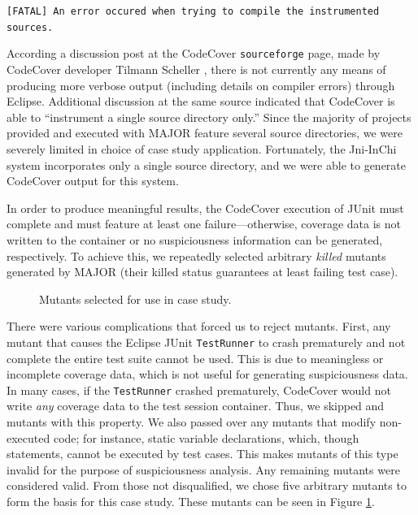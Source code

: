 \vspace{5mm}
\texttt{[FATAL] An error occured when trying to compile the instrumented sources.}
\vspace{2mm}

According a discussion post at the CodeCover \texttt{sourceforge}
page, made by CodeCover developer Tilmann Scheller \cite{discpost}, there is not currently any 
means of producing more verbose output (including details on compiler errors) through Eclipse.  
Additional discussion at the same source indicated that CodeCover is able to ``instrument
a single source directory only.''  Since the majority of projects provided and executed with MAJOR
feature several source directories, we were severely limited in choice of case study application.  
Fortunately, the Jni-InChi system incorporates only a single source directory, and we were able
to generate CodeCover output for this system.

In order to produce meaningful results, the CodeCover execution of JUnit must complete and must
feature at least one failure---otherwise, coverage data is not written to the container or no
suspiciousness information can be generated, respectively.  To achieve this, we repeatedly selected
arbitrary \textit{killed} mutants generated by MAJOR (their killed status guarantees at least failing
test case).  

\begin{figure}[tb]

\caption{Mutants selected for use in case study.}
\label{fig:mutants}
\end{figure}

There were various complications that forced us to reject mutants.  First, any mutant that
causes the Eclipse JUnit \texttt{TestRunner} to crash prematurely and not complete the entire test 
suite cannot be used.  This is due to meaningless or incomplete coverage data, which is not useful
for generating suspiciousness data.  In many cases, if the \texttt{TestRunner} crashed prematurely,
CodeCover would not write \emph{any} coverage data to the test session container.  Thus, we skipped
and mutants with this property. We also passed over any mutants that modify non-executed code; for instance, static variable declarations, which, though statements, cannot be executed by test cases.  
This makes mutants of this type invalid for the purpose of suspiciousness analysis.  Any remaining
mutants were considered valid.  From those not disqualified, we chose five arbitrary mutants to 
form the basis for this case study.   These mutants can be seen in Figure \ref{fig:mutants}.

